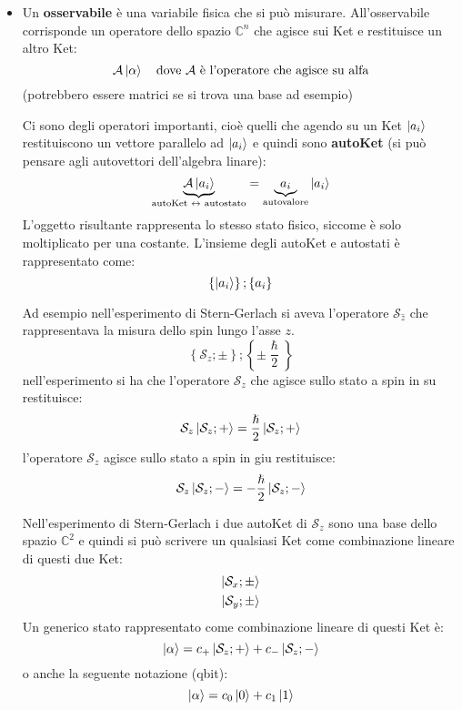 \documentclass[a4paper]{article}
\begin{document}
\begin{itemize}
  \item Un \textbf{osservabile} è una variabile fisica che si può misurare. All'osservabile
    corrisponde un operatore dello spazio \( \mathbb{C}^n \) che agisce sui Ket e
    restituisce un altro Ket:
    \[
      \mathcal{A} \ket{\alpha} \quad \text{dove } \mathcal{A} \text{ è l'operatore che
      agisce su alfa}
    \] 
    (potrebbero essere matrici se si trova una base ad esempio)

    \vspace{1em}
    \noindent
    Ci sono degli operatori importanti, cioè quelli che agendo su un Ket \( \ket{a_i} \)
    restituiscono un vettore parallelo ad \( \ket{a_i} \) e quindi sono \textbf{autoKet}
    (si può pensare agli autovettori dell'algebra linare):
    \[
      \underbrace{\mathcal{A} \ket{a_i}}_{\text{autoKet } \leftrightarrow \text{ autostato}}
      = \underbrace{a_i}_{\text{autovalore}} \ket{a_i}
    \] 
    L'oggetto risultante rappresenta lo stesso stato fisico, siccome è solo moltiplicato
    per una costante. L'insieme degli autoKet e autostati è rappresentato come:
    \[
      \left\{ \ket{a_i} \right\}; \left\{ a_i \right\}
    \] 

    \vspace{1em}
    \noindent
    Ad esempio nell'esperimento di Stern-Gerlach si aveva l'operatore
    \( \mathcal{S}_{\hat{z}} \) che rappresentava la misura dello spin lungo l'asse \( z \).
    \[
      \left\{ \mathcal{S}_z; \pm \right\}; \left\{ \pm \frac{\hslash}{2} \right\}
    \] 
    nell'esperimento si ha che l'operatore \( \mathcal{S}_z \) che agisce sullo stato a
    spin in su restituisce:
    \[
      \mathcal{S}_z \ket{\mathcal{S}_z; +} = \frac{\hslash}{2} \ket{\mathcal{S}_z; +}
    \] 
    l'operatore \( \mathcal{S}_z \) agisce sullo stato a spin in giu restituisce:
    \[
      \mathcal{S}_z \ket{\mathcal{S}_z; -} = -\frac{\hslash}{2} \ket{\mathcal{S}_z; -}
    \]

    \vspace{1em}
    \noindent
    Nell'esperimento di Stern-Gerlach i due autoKet di \( \mathcal{S}_z \) sono una base
    dello spazio \( \mathbb{C}^2 \) e quindi si può scrivere un qualsiasi Ket come
    combinazione lineare di questi due Ket:
    \[
      \begin{aligned}
        \ket{\mathcal{S}_x; \pm}\\
        \ket{\mathcal{S}_y; \pm}\\
      \end{aligned}
    \] 
    Un generico stato rappresentato come combinazione lineare di questi Ket è:
    \[
      \ket{\alpha} = c_+ \ket{\mathcal{S}_z; +} + c_- \ket{\mathcal{S}_z; -}
    \] 
    o anche la seguente notazione (qbit):
    \[
      \ket{\alpha} = c_0 \ket{0} + c_1 \ket{1}
    \] 


\end{itemize}
\end{document}
